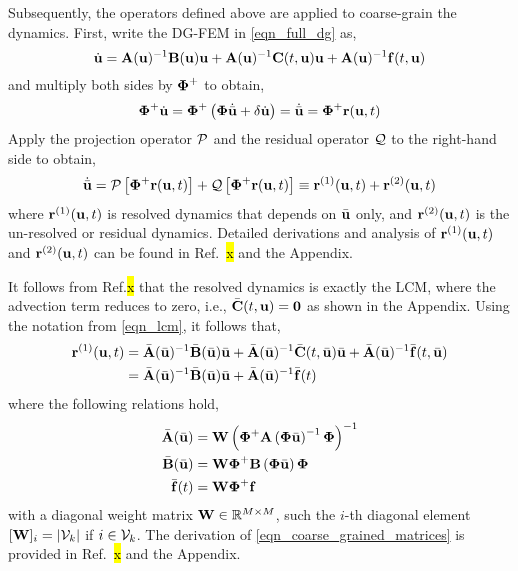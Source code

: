 Subsequently, the operators defined above are applied to coarse-grain the dynamics. First, write the DG-FEM in \cref{eqn_full_dg} as,
\begin{equation}
    \dot{\mathbf{u}} = \mathbf{A}(\mathbf{u})^{-1}\mathbf{B}(\mathbf{u})\mathbf{u} + \mathbf{A}(\mathbf{u})^{-1}\mathbf{C}(t,\mathbf{u})\mathbf{u} + \mathbf{A}(\mathbf{u})^{-1}\mathbf{f}(t,\mathbf{u})\label{eqn_full_dg_rearranged}
\end{equation}
and multiply both sides by $\boldsymbol{\Phi}^{+}$ to obtain,
\begin{equation}
    \boldsymbol{\Phi}^{+}\dot{\mathbf{u}} = \boldsymbol{\Phi}^{+}\left(\boldsymbol{\Phi}\dot{\bar{\mathbf{u}}} + \delta\dot{\mathbf{u}}\right) = \dot{\bar{\mathbf{u}}} = \boldsymbol{\Phi}^{+}\mathbf{r}(\mathbf{u},t)
\end{equation}
Apply the projection operator $\mathcal{P}$ and the residual operator $\mathcal{Q}$ to the right-hand side to obtain,
\begin{equation}
    \dot{\bar{\mathbf{u}}} = \mathcal{P}\left[\boldsymbol{\Phi}^{+}\mathbf{r}(\mathbf{u},t)\right] + \mathcal{Q}\left[\boldsymbol{\Phi}^{+}\mathbf{r}(\mathbf{u},t)\right]\equiv \mathbf{r}^{(1)}(\mathbf{u},t) + \mathbf{r}^{(2)}(\mathbf{u},t)\label{eqn_coarse_grained_dynamics}
\end{equation}
where $\mathbf{r}^{(1)}(\mathbf{u},t)$ is resolved dynamics that depends on $\bar{\mathbf{u}}$ only, and $\mathbf{r}^{(2)}(\mathbf{u},t)$ is the un-resolved or residual dynamics. Detailed derivations and analysis of $\mathbf{r}^{(1)}(\mathbf{u},t)$ and $\mathbf{r}^{(2)}(\mathbf{u},t)$  can be found in Ref.~\hl{x} and the Appendix. 

It follows from Ref.\hl{x} that the resolved dynamics is exactly the LCM, where the advection term reduces to zero, i.e., $\bar{\mathbf{C}}(t,\mathbf{u}) = \boldsymbol{0}$ as shown in the Appendix. Using the notation from \cref{eqn_lcm}, it follows that,
\begin{align}
    \mathbf{r}^{(1)}(\mathbf{u},t) &= \bar{\mathbf{A}}(\bar{\mathbf{u}})^{-1}\bar{\mathbf{B}}(\bar{\mathbf{u}})\bar{\mathbf{u}} + \bar{\mathbf{A}}(\bar{\mathbf{u}})^{-1}\bar{\mathbf{C}}(t,\bar{\mathbf{u}})\bar{\mathbf{u}} + \bar{\mathbf{A}}(\bar{\mathbf{u}})^{-1}\bar{\mathbf{f}}(t,\bar{\mathbf{u}})\notag\\
    &= \bar{\mathbf{A}}(\bar{\mathbf{u}})^{-1}\bar{\mathbf{B}}(\bar{\mathbf{u}})\bar{\mathbf{u}} + \bar{\mathbf{A}}(\bar{\mathbf{u}})^{-1}\bar{\mathbf{f}}(t)\label{eqn_resolved_dynamics_no_advection}
\end{align}
where the following relations hold,
\begin{subequations}
    \begin{align}
        \bar{\mathbf{A}}(\bar{\mathbf{u}}) &= \mathbf{W}\left(\boldsymbol{\Phi}^{+}\mathbf{A}\left(\boldsymbol{\Phi}\bar{\mathbf{u}}\right)^{-1}\boldsymbol{\Phi}\right)^{-1}\\
        \bar{\mathbf{B}}(\bar{\mathbf{u}}) &= \mathbf{W}\boldsymbol{\Phi}^{+}\mathbf{B}\left(\boldsymbol{\Phi}\bar{\mathbf{u}}\right)\boldsymbol{\Phi}\\
        \bar{\mathbf{f}}(t) &= \mathbf{W}\boldsymbol{\Phi}^{+}\mathbf{f}
    \end{align}\label{eqn_coarse_grained_matrices}
\end{subequations}
with a diagonal weight matrix $\mathbf{W}\in\mathbb{R}^{M\times M}$, such the $i$-th diagonal element $[\mathbf{W}]_i=\left|\mathcal{V}_k\right|$ if $i\in\mathcal{V}_k$.  The derivation of \cref{eqn_coarse_grained_matrices} is provided in Ref.~\hl{x} and the Appendix.

